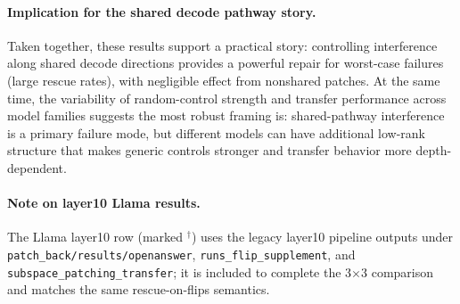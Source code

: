 \paragraph{Implication for the shared decode pathway story.}
Taken together, these results support a practical story: controlling interference along shared decode directions provides a powerful repair for worst-case failures (large rescue rates), with negligible effect from nonshared patches. At the same time, the variability of random-control strength and transfer performance across model families suggests the most robust framing is: shared-pathway interference is a primary failure mode, but different models can have additional low-rank structure that makes generic controls stronger and transfer behavior more depth-dependent.

\paragraph{Note on layer10 Llama results.}
The Llama layer10 row (marked $^{\dagger}$) uses the legacy layer10 pipeline outputs under \texttt{patch\_back/results/openanswer}, \texttt{runs\_flip\_supplement}, and \texttt{subspace\_patching\_transfer}; it is included to complete the 3$\times$3 comparison and matches the same rescue-on-flips semantics.
